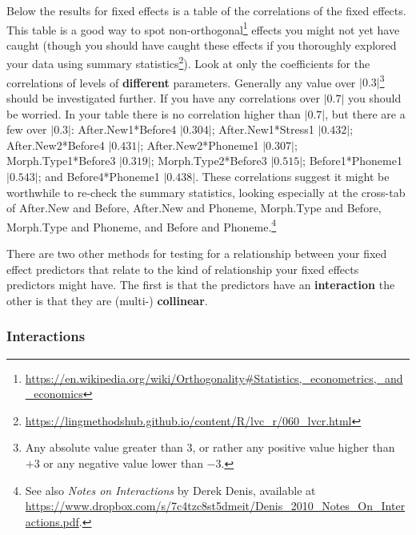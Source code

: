 \documentclass[
  10pt,
  letterpaper]{article}
\renewcommand\texttt[1]{{\ttfamily\color{BrickRed}#1}}
\DeclareRobustCommand{\href}[2]{#2\footnote{\url{#1}}}
\begin{document}
Below the results for fixed effects is a table of the correlations of
the fixed effects. This table is a good way to spot
non-\href{https://en.wikipedia.org/wiki/Orthogonality\#Statistics,_econometrics,_and_economics}{orthogonal}
effects you might not yet have caught (though you should have caught
these effects if you thoroughly explored your data using
\href{https://lingmethodshub.github.io/content/R/lvc_r/060_lvcr.html}{summary
statistics}). Look at only the coefficients for the correlations of
levels of \textbf{different} parameters. Generally any value over
\(|0.3|\)\footnote{Any absolute value greater than \(3\), or rather any
  positive value higher than \(+3\) or any negative value lower than
  \(-3\).} should be investigated further. If you have any correlations
over \(|0.7|\) you should be worried. In your table there is no
correlation higher than \(|0.7|\), but there are a few over \(|0.3|\):
\texttt{After.New1*Before4} \(|0.304|\); \texttt{After.New1*Stress1}
\(|0.432|\); \texttt{After.New2*Before4} \(|0.431|\);
\texttt{After.New2*Phoneme1} \(|0.307|\); \texttt{Morph.Type1*Before3}
\(|0.319|\); \texttt{Morph.Type2*Before3} \(|0.515|\);
\texttt{Before1*Phoneme1} \(|0.543|\); and \texttt{Before4*Phoneme1}
\(|0.438|\). These correlations suggest it might be worthwhile to
re-check the summary statistics, looking especially at the cross-tab of
\texttt{After.New} and \texttt{Before}, \texttt{After.New} and
\texttt{Phoneme}, \texttt{Morph.Type} and \texttt{Before},
\texttt{Morph.Type} and \texttt{Phoneme}, and \texttt{Before} and
\texttt{Phoneme}.\footnote{See also \emph{Notes on Interactions} by
  Derek Denis, available at
  \url{https://www.dropbox.com/s/7c4tzc8st5dmeit/Denis_2010_Notes_On_Interactions.pdf}.}

There are two other methods for testing for a relationship between your
fixed effect predictors that relate to the kind of relationship your
fixed effects predictors might have. The first is that the predictors
have an \textbf{interaction} the other is that they are (multi-)
\textbf{collinear}.

\hypertarget{interactions}{%
\subsubsection{Interactions}\label{interactions}}
\end{document}
